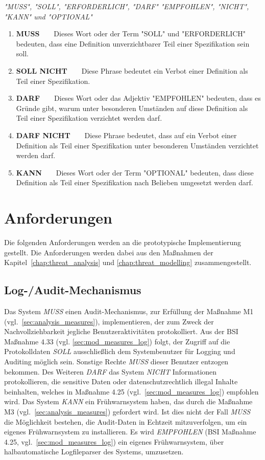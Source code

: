 \documentclass[11pt,a4paper]{report}
\begin{document}
\begin{center}
\textit{"MUSS", "SOLL", "ERFORDERLICH", "DARF" "EMPFOHLEN", "NICHT", "KANN" und "OPTIONAL"}
\end{center} 

\begin{enumerate}
\item \textbf{MUSS}~~~~Dieses Wort oder der Term "SOLL" und "ERFORDERLICH" bedeuten, dass eine  Definition unverzichtbarer Teil einer Spezifikation sein soll.
\item \textbf{SOLL NICHT}~~~~Diese Phrase bedeutet ein Verbot einer Definition als Teil einer Spezifikation.
\item \textbf{DARF}~~~~Dieses Wort oder das Adjektiv "EMPFOHLEN" bedeuten, dass es  Gründe gibt, warum unter besonderen Umständen auf diese Definition als Teil einer Spezifikation verzichtet werden darf. 
\item \textbf{DARF NICHT}~~~~Diese Phrase bedeutet, dass auf ein Verbot einer Definition als Teil einer Spezifikation unter besonderen Umständen verzichtet werden darf.
\item \textbf{KANN}~~~~Dieses Wort oder der Term "OPTIONAL" bedeuten, dass diese Definition als Teil einer Spezifikation nach Belieben umgesetzt werden darf.
\end{enumerate}

\section{Anforderungen}

Die folgenden Anforderungen werden an die prototypische Implementierung gestellt. Die Anforderungen werden dabei aus den Maßnahmen der Kapitel~\ref{chap:threat_analysis} und \ref{chap:threat_modelling} zusammengestellt.

\subsection{Log-/Audit-Mechanismus}

Das System \textit{MUSS} einen Audit-Mechanismus, zur Erfüllung der Maßnahme M1 (vgl.~\ref{sec:analysis_measures}), implementieren, der zum Zweck der Nachvollziehbarkeit jegliche Benutzeraktivitäten protokolliert. Aus der BSI Maßnahme 4.33 (vgl. \ref{sec:mod_measures_log}) folgt, der Zugriff auf die Protokolldaten \textit{SOLL} ausschließlich dem Systembenutzer für Logging und Auditing möglich sein. Sonstige Rechte \textit{MUSS} dieser Benutzer entzogen bekommen. Des Weiteren \textit{DARF} das System \textit{NICHT} Informationen protokollieren, die sensitive Daten oder datenschutzrechtlich illegal Inhalte beinhalten, welches in Maßnahme 4.25 (vgl.~\ref{sec:mod_measures_log}) empfohlen wird. Das System \textit{KANN} ein Frühwarnsystem haben, das durch die Maßnahme M3 (vgl.~\ref{sec:analysis_measures}) gefordert wird. Ist dies nicht der Fall \textit{MUSS} die Möglichkeit bestehen, die Audit-Daten in Echtzeit mitzuverfolgen, um ein eigenes Frühwarnsystem zu installieren. Es wird \textit{EMPFOHLEN} (BSI Maßnahme 4.25, vgl.~\ref{sec:mod_measures_log}) ein eigenes Frühwarnsystem, über halbautomatische Logfileparser des Systems, umzusetzen.
\end{document}
